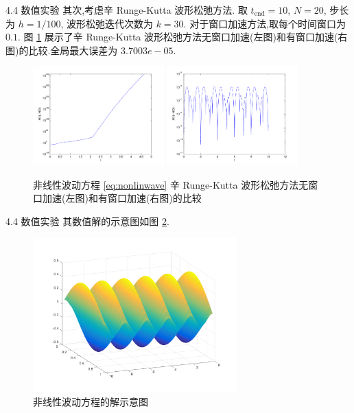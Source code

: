 \documentclass{beamer}
\begin{document}
\begin{frame}{4.4 数值实验}
其次,考虑辛 Runge-Kutta 波形松弛方法. 取 $t_{\text{end}} = 10$, $N=20$, 步长为 $h = 1/100$, 波形松弛迭代次数为 $k=30$. 对于窗口加速方法,取每个时间窗口为 $0.1$. 图 \ref{fig:ex3srkcom} 展示了辛 Runge-Kutta 波形松弛方法无窗口加速(左图)和有窗口加速(右图)的比较.全局最大误差为 $3.7003e-05$.

\begin{figure}[h!]
  \centering
  \includegraphics[width=0.45\textwidth]{03/Fig10-1.pdf}
  \includegraphics[width=0.45\textwidth]{03/Fig10-2.pdf}
  \caption{非线性波动方程 \eqref{eq:nonlinwave} 辛 Runge-Kutta 波形松弛方法无窗口加速(左图)和有窗口加速(右图)的比较}
  \label{fig:ex3srkcom}
\end{figure}
\end{frame}

\begin{frame}{4.4 数值实验}
其数值解的示意图如图 \ref{fig:wavefig}.

\begin{figure}[h!]
  \centering
  \includegraphics[width=0.7\textwidth]{03/wave.pdf}
  \caption{非线性波动方程的解示意图}
  \label{fig:wavefig}
\end{figure}
\end{frame}
\end{document}
